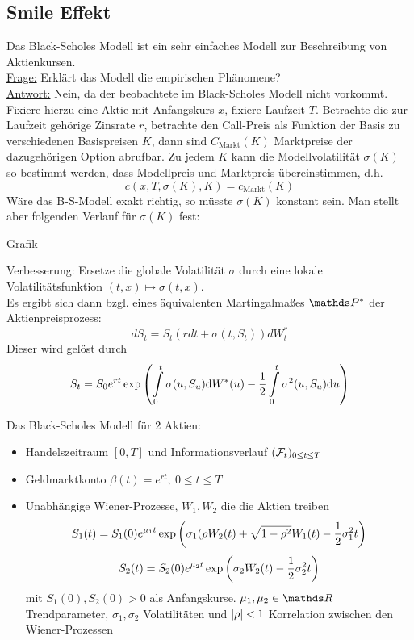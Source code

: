\subsection{Smile Effekt}
\label{sub:smile_effekt}
Das Black-Scholes Modell ist ein sehr einfaches Modell zur Beschreibung von Aktienkursen.\\
\uline{Frage:}
Erklärt das Modell die empirischen Phänomene?\\
\uline{Antwort:}
Nein, da der beobachtete  im Black-Scholes Modell nicht vorkommt.\\
Fixiere hierzu eine Aktie mit Anfangskurs $x$, fixiere Laufzeit $T$. 
Betrachte die zur Laufzeit gehörige Zinsrate $r$, betrachte den Call-Preis als Funktion der Basis zu verschiedenen Basispreisen $K$, dann sind $C_{\text{Markt}}(K)$ Marktpreise der dazugehörigen Option abrufbar.
Zu jedem $K$ kann die Modellvolatilität $\sigma(K)$ so bestimmt werden, dass Modellpreis und Marktpreis übereinstimmen, d.h.
\[
c(x,T,\sigma(K),K)=c_{\text{Markt}}(K)
\]
Wäre das B-S-Modell exakt richtig, so müsste $\sigma(K)$ konstant sein.
Man stellt aber folgenden Verlauf für $\sigma(K)$ fest:
\begin{center}
	Grafik
\end{center}
Verbesserung:
Ersetze die globale Volatilität $\sigma$ durch eine lokale Volatilitätsfunktion $(t,x)\mapsto \sigma(t,x)$.\\
Es ergibt sich dann bzgl. eines äquivalenten Martingalmaßes $\Pw^*$ der Aktienpreisprozess:
\[
dS_t=S_t(rdt+\sigma(t,S_t))dW_t^*
\]
Dieser wird gelöst durch
\[
S_t=S_0e^{rt}\exp\left( \int\limits_0^t \sigma(u,S_u)\mathrm{d} W^*(u)-\frac{1}{2}\int\limits_0^t \sigma^2(u,S_u)\mathrm{d} u\right)
\]

Das Black-Scholes Modell für 2 Aktien:
\begin{itemize}
	\item Handelszeitraum $[0,T]$ und Informationsverlauf $(\mathcal{F}_t)_{0\le t\le T}$
	\item Geldmarktkonto $\beta(t)=e^{rt},~0\le t\le T$
	\item Unabhängige Wiener-Prozesse, $W_1,W_2$ die die Aktien treiben
	\[
	S_1(t)=S_1(0)e^{\mu_1t}\exp\left( \sigma_1(\rho W_2(t)+\sqrt{1-\rho^2}W_1(t)-\frac{1}{2}\sigma_1^2t\right)
	\]
	\[
	S_2(t)=S_2(0)e^{\mu_2t}\exp\left( \sigma_2 W_2(t)-\frac{1}{2}\sigma_2^2t\right)
	\]
	mit $S_1(0),S_2(0)>0$ als Anfangskurse.
	$\mu_1,\mu_2\in \R$ Trendparameter, $\sigma_1,\sigma_2$ Volatilitäten und $\left\vert\rho\right\vert<1$ Korrelation zwischen den Wiener-Prozessen
\end{itemize}

